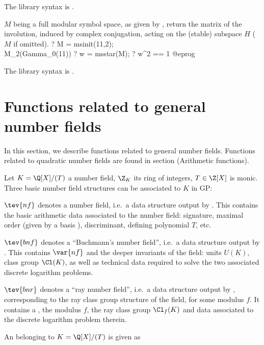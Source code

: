 The library syntax is .

\label{se:msstar}
$M$ being a full modular symbol space, as given by ,
return the matrix of the \kbd{*} involution, induced by complex conjugation,
acting on the (stable) subspace $H$ ($M$ if omitted).
\bprog
? M = msinit(11,2); \\ M_2(Gamma_0(11))
? w = msstar(M);
? w^2 == 1
@eprog

The library syntax is .

\section{Functions related to general number fields}

In this section, we describe functions related to general number fields.
Functions related to quadratic number fields are found in
section  (Arithmetic functions).


Let $K = \Q[X] / (T)$ a number field, $\Z_K$ its ring of integers, $T\in\Z[X]$
is monic. Three basic number field structures can be associated to $K$ in
GP:

\item $\tev{nf}$ denotes a number field, i.e.~a data structure output by
. This contains the basic arithmetic data associated to the
number field: signature, maximal order (given by a basis ),
discriminant, defining polynomial $T$, etc.

\item $\tev{bnf}$ denotes a ``Buchmann's number field'', i.e.~a
data structure output by . This contains
$\var{nf}$ and the deeper invariants of the field: units $U(K)$, class group
$\Cl(K)$, as well as technical data required to solve the two associated
discrete logarithm problems.

\item $\tev{bnr}$ denotes a ``ray number field'', i.e.~a data structure
output by , corresponding to the ray class group structure of
the field, for some modulus $f$. It contains a , the modulus
$f$, the ray class group $\Cl_f(K)$ and data associated to
the discrete logarithm problem therein.


\noindent An  belonging to $K = \Q[X]/(T)$ is given as

